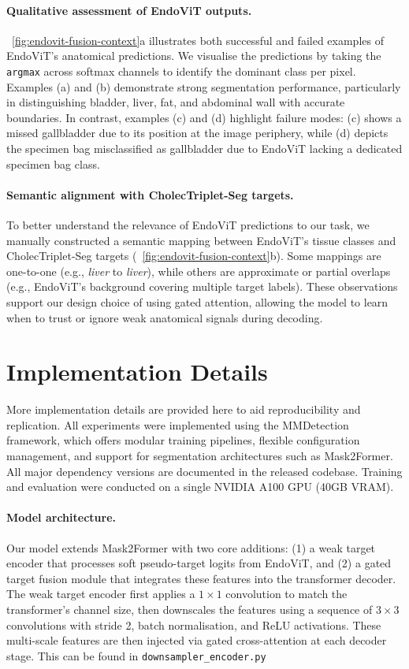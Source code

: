 \documentclass[11pt]{article}
\newcommand{\figref}[1]{\figurename~\ref{#1}}
\begin{document}
\paragraph{Qualitative assessment of EndoViT outputs.}
\figref{fig:endovit-fusion-context}a illustrates both successful and failed examples of EndoViT’s anatomical predictions. We visualise the predictions by taking the \texttt{argmax} across softmax channels to identify the dominant class per pixel. Examples (a) and (b) demonstrate strong segmentation performance, particularly in distinguishing bladder, liver, fat, and abdominal wall with accurate boundaries. In contrast, examples (c) and (d) highlight failure modes: (c) shows a missed gallbladder due to its position at the image periphery, while (d) depicts the specimen bag misclassified as gallbladder due to EndoViT lacking a dedicated specimen bag class.

\paragraph{Semantic alignment with CholecTriplet-Seg targets.}
To better understand the relevance of EndoViT predictions to our task, we manually constructed a semantic mapping between EndoViT’s tissue classes and CholecTriplet-Seg targets (\figref{fig:endovit-fusion-context}b). Some mappings are one-to-one (e.g., \textit{liver} to \textit{liver}), while others are approximate or partial overlaps (e.g., EndoViT’s background covering multiple target labels). These observations support our design choice of using gated attention, allowing the model to learn when to trust or ignore weak anatomical signals during decoding.


\section{Implementation Details}
More implementation details are provided here to aid reproducibility and replication. All experiments were implemented using the MMDetection framework, which offers modular training pipelines, flexible configuration management, and support for segmentation architectures such as Mask2Former. All major dependency versions are documented in the released codebase. Training and evaluation were conducted on a single NVIDIA A100 GPU (40GB VRAM).

\paragraph{Model architecture.}
Our model extends Mask2Former with two core additions: (1) a weak target encoder that processes soft pseudo-target logits from EndoViT, and (2) a gated target fusion module that integrates these features into the transformer decoder. The weak target encoder first applies a $1 \times 1$ convolution to match the transformer’s channel size, then downscales the features using a sequence of $3 \times 3$ convolutions with stride 2,  batch normalisation, and ReLU activations. These multi-scale features are then injected via gated cross-attention at each decoder stage. This can be found in \texttt{downsampler\_encoder.py}
\end{document}
